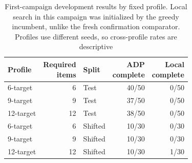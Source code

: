 \begin{table}[t]
  \centering
  \caption{First-campaign development results by fixed profile. Local search in this campaign was initialized by the greedy incumbent, unlike the fresh confirmation comparator. Profiles use different seeds, so cross-profile rates are descriptive}
  \label{tab:required-profile-results}
  \renewcommand{\arraystretch}{1.08}
  \setlength{\tabcolsep}{5pt}
  \footnotesize
  \begin{tabular*}{\linewidth}{@{\extracolsep{\fill}}lrlrr@{}}
    \toprule
    Profile & \shortstack[r]{Required\\items} & Split & \shortstack[r]{ADP\\complete} & \shortstack[r]{Local\\complete} \\
    \midrule
    6-target & 6 & Test & 40/50 & 0/50 \\
    9-target & 9 & Test & 37/50 & 0/50 \\
    12-target & 12 & Test & 38/50 & 0/50 \\
    6-target & 6 & Shifted & 10/30 & 0/30 \\
    9-target & 9 & Shifted & 10/30 & 0/30 \\
    12-target & 12 & Shifted & 10/30 & 1/30 \\
    \bottomrule
  \end{tabular*}
\end{table}
